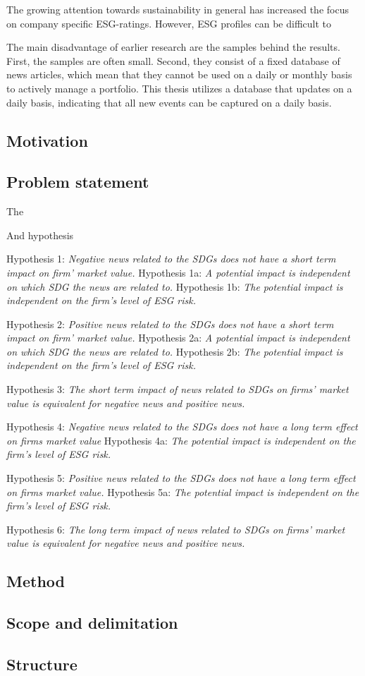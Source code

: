 The growing attention towards sustainability in general has increased the focus on company specific ESG-ratings. However, ESG profiles can be difficult to

The main disadvantage of earlier research are the samples behind the results. First, the samples are often small. Second, they consist of a fixed database of news articles, which mean that they cannot be used on a daily or monthly basis to actively manage a portfolio. This thesis utilizes a database that updates on a daily basis, indicating that all new events can be captured on a daily basis.    

\subsection{Motivation}

\subsection{Problem statement}

The 


And hypothesis

Hypothesis 1: \textit{Negative news related to the SDGs does not have a short term impact on firm' market value.
}
Hypothesis 1a: \textit{A potential impact is independent on which SDG the news are related to.}  
Hypothesis 1b: \textit{The potential impact is independent on the firm's level of ESG risk.}

Hypothesis 2: \textit{Positive news related to the SDGs does not have a short term impact on firm' market value.}
Hypothesis 2a: \textit{A potential impact is independent on which SDG the news are related to.}  
Hypothesis 2b: \textit{The potential impact is independent on the firm's level of ESG risk.}

Hypothesis 3: \textit{The short term impact of news related to SDGs on firms' market value is equivalent for negative news and positive news.}

Hypothesis 4: \textit{Negative news related to the SDGs does not have a long term effect on firms market value}
Hypothesis 4a: \textit{The potential impact is independent on the firm's level of ESG risk.}


Hypothesis 5: \textit{Positive news related to the SDGs does not have a long term effect on firms market value.}
Hypothesis 5a: \textit{The potential impact is independent on the firm's level of ESG risk.} 

Hypothesis 6: \textit{The long term impact of news related to SDGs on firms' market value is equivalent for negative news and positive news.}
\subsection{Method}

\subsection{Scope and delimitation}

\subsection{Structure}
